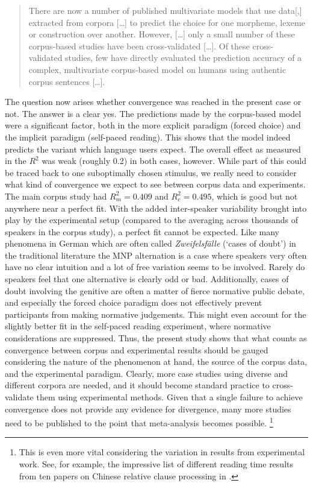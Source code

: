 \begin{quote}
  There are now a number of published multivariate models that use data[,] extracted from corpora [\ldots] to predict the choice for one morpheme, lexeme or construction over another.
  However, [\ldots] only a small number of these corpus-based studies have been cross-validated [\ldots].
  Of these cross- validated studies, few have directly evaluated the prediction accuracy of a complex, multivariate corpus-based model on humans using authentic corpus sentences [\ldots].
\end{quote}

The question now arises whether convergence was reached in the present case or not.
The answer is a clear yes.
The predictions made by the corpus-based model were a significant factor, both in the more explicit paradigm (forced choice) and the implicit paradigm (self-paced reading).
This shows that the model indeed predicts the variant which language users expect.
The overall effect as measured in the $R^2$ was weak (roughly 0.2) in both cases, however.
While part of this could be traced back to one suboptimally chosen stimulus, we really need to consider what kind of convergence we expect to see between corpus data and experiments.
The main corpus study had $R^2_m=0.409$ and $R^2_c=0.495$, which is good but not anywhere near a perfect fit.
With the added inter-speaker variability brought into play by the experimental setup (compared to the averaging across thousands of speakers in the corpus study), a perfect fit cannot be expected.
Like many phenomena in German which are often called \textit{Zweifelsfälle} (`cases of doubt') in the traditional literature \citep{Duden09,Klein2009} the MNP alternation is a case where speakers very often have no clear intuition and a lot of free variation seems to be involved.
Rarely do speakers feel that one alternative is clearly odd or bad.
Additionally, cases of doubt involving the genitive are often a matter of fierce normative public debate, and especially the forced choice paradigm does not effectively prevent participants from making normative judgements.
This might even account for the slightly better fit in the self-paced reading experiment, where normative considerations are suppressed.
Thus, the present study shows that what counts as convergence between corpus and experimental results should be gauged considering the nature of the phenomenon at hand, the source of the corpus data, and the experimental paradigm.
Clearly, more case studies using diverse and different corpora are needed, and it should become standard practice to cross-validate them using experimental methods.
Given that a single failure to achieve convergence does not provide any evidence for divergence, many more studies need to be published to the point that meta-analysis becomes possible.%
\footnote{This is even more vital considering the variation in results from experimental work.
See, for example, the impressive list of different reading time results from ten papers on Chinese relative clause processing in \citet[8]{Vasishth2015}.}

